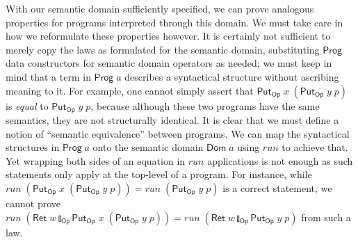 \documentclass{llncs}
\newcommand{\Conid}[1]{\mathit{#1}}
\newcommand{\Varid}[1]{\mathit{#1}}
\let\Varid\mathit
\let\Conid\mathsf
\begin{document}
\label{subsec:contextual-equivalence}
With our semantic domain sufficiently specified, we can prove analogous
properties for programs interpreted through this domain.
We must take care in how we reformulate these properties however.
It is certainly not sufficient to merely copy the laws as formulated for the
semantic domain, substituting \ensuremath{\Conid{Prog}} data constructors for semantic domain
operators as needed; we must keep in mind that a term in \ensuremath{\Conid{Prog}\;\Varid{a}} describes a
syntactical structure without ascribing meaning to it.
For example, one cannot simply assert that \ensuremath{\Conid{Put}_\Conid{Op}\;\Varid{x}\;(\Conid{Put}_\Conid{Op}\;\Varid{y}\;\Varid{p})} is \emph{equal} to
\ensuremath{\Conid{Put}_\Conid{Op}\;\Varid{y}\;\Varid{p}},
because although these two programs have the same semantics, they
are not structurally identical.
It is clear that we must define a notion of ``semantic equivalence'' between
programs.
We can map the syntactical structures in \ensuremath{\Conid{Prog}\;\Varid{a}} onto the semantic domain
\ensuremath{\Conid{Dom}\;\Varid{a}} using \ensuremath{\Varid{run}} to achieve that.
Yet wrapping both sides of an equation in \ensuremath{\Varid{run}} applications
is not enough as such statements only apply at the top-level of a program.
For instance, while \ensuremath{\Varid{run}\;(\Conid{Put}_\Conid{Op}\;\Varid{x}\;(\Conid{Put}_\Conid{Op}\;\Varid{y}\;\Varid{p}))\mathrel{=}\Varid{run}\;(\Conid{Put}_\Conid{Op}\;\Varid{y}\;\Varid{p})} is a correct statement,
we cannot prove
\ensuremath{\Varid{run}\;(\Conid{Ret}\;\Varid{w}\mathbin{\talloblong}_\Conid{Op}\Conid{Put}_\Conid{Op}\;\Varid{x}\;(\Conid{Put}_\Conid{Op}\;\Varid{y}\;\Varid{p}))\mathrel{=}\Varid{run}\;(\Conid{Ret}\;\Varid{w}\mathbin{\talloblong}_\Conid{Op}\Conid{Put}_\Conid{Op}\;\Varid{y}\;\Varid{p})}
from such a law.
\end{document}
